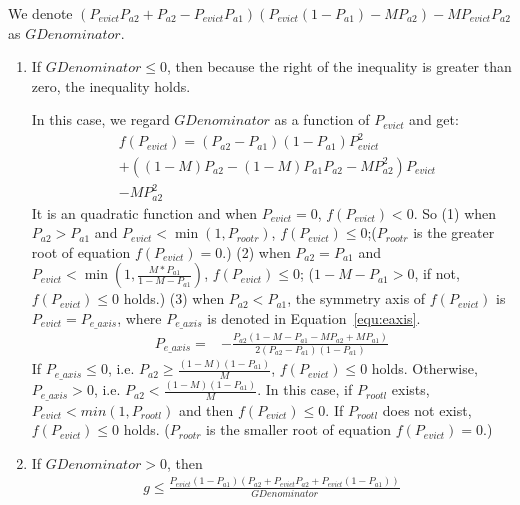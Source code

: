 We denote $(P_{evict}P_{a2}+P_{a2}-P_{evict}P_{a1})(P_{evict}(1-P_{a1})-MP_{a2})-MP_{evict}P_{a2}$ as $GDenominator$.
\begin{enumerate}
\item
If $GDenominator\leq0$,
then
because the right of the inequality is greater than zero, the inequality holds.

In this case, we regard $GDenominator$ as a function of $P_{evict}$ and get:
\begin{equation}
\begin{split}
&f(P_{evict})=(P_{a2}-P_{a1})(1-P_{a1})P_{evict}^2 \\
&+((1-M)P_{a2}-(1-M)P_{a1}P_{a2}-MP_{a2}^2)P_{evict}\\
&-MP_{a2}^2
\end{split}\end{equation}
It is an quadratic function and when $P_{evict} = 0$, $f(P_{evict})<0$.
So
(1) when $P_{a2}>P_{a1}$ and $P_{evict}< \min(1,P_{rootr})$,
    $f(P_{evict}) \leq0$;($P_{rootr}$ is the greater root of equation $f(P_{evict})=0$.)
(2) when $P_{a2}=P_{a1}$ and $P_{evict}< \min(1,\frac{M*P_{a1}}{1-M-P_{a1}})$, $f(P_{evict}) \leq0$; ($1-M-P_{a1}>0$, if not,$f(P_{evict}) \leq0$ holds.)
(3) when $P_{a2}<P_{a1}$, the symmetry axis of $f(P_{evict})$ is $P_{evict} = P_{e\_axis}$, where $P_{e\_axis}$ is denoted in Equation~\ref{equ:eaxis}.
\begin{equation}
\label{equ:eaxis}
\begin{split}
P_{e\_axis} = &-\frac{P_{a2}(1-M-P_{a1}-MP_{a2}+MP_{a1})}{2(P_{a2}-P_{a1})(1-P_{a1})}
\end{split}
\end{equation}
If $P_{e\_axis} \leq 0$, i.e. $P_{a2}\geq \frac{(1-M)(1-P_{a1})}{M}$, $f(P_{evict}) \leq0$ holds.
Otherwise, $P_{e\_axis} > 0$, i.e. $P_{a2} < \frac{(1-M)(1-P_{a1})}{M}$. In this case, if $P_{rootl}$ exists, $P_{evict}< min(1,P_{rootl})$ and then $f(P_{evict}) \leq0$. If $P_{rootl}$ does not exist, $f(P_{evict}) \leq0$ holds. ($P_{rootr}$ is the smaller root of equation $f(P_{evict})=0$.)

\item
If $GDenominator > 0$,
then
\begin{equation}
\begin{split}
g \leq \frac{P_{evict}(1-P_{a1})(P_{a2}+P_{evict}P_{a2}+P_{evict}(1-P_{a1}))}{GDenominator}
\end{split}
\end{equation}


\end{enumerate}
